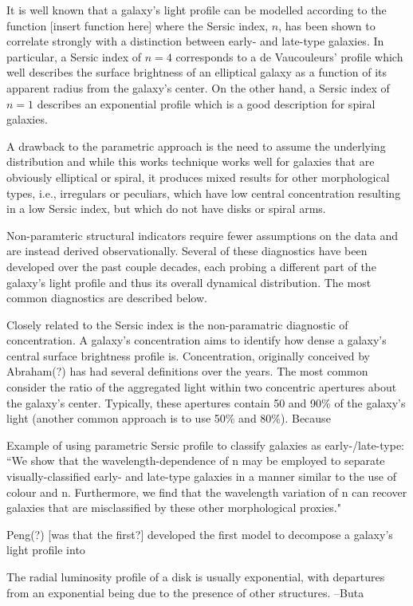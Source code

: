 It is well known that a galaxy's light profile can be modelled according to the function [insert function here] where the Sersic index, $n$, has been shown to correlate strongly with a distinction between early- and late-type galaxies. In particular, a Sersic index of $n=4$ corresponds to a de Vaucouleurs' profile which well describes the surface brightness of an elliptical galaxy as a function of its apparent radius from the galaxy's center. On the other hand, a Sersic index of $n=1$ describes an exponential profile which is a good description for spiral galaxies. 

A drawback to the parametric approach is the need to assume the underlying distribution and while this works technique works well for galaxies that are obviously elliptical or spiral, it produces mixed results for other morphological types, i.e., irregulars or peculiars, which have low central concentration resulting in a low Sersic index, but which do not have disks or spiral arms. 

Non-paramteric structural indicators require fewer assumptions on the data and are instead derived observationally. Several of these diagnostics have been developed over the past couple decades, each probing a different part of the galaxy's light profile and thus its overall dynamical distribution. The most common diagnostics are described below. 

Closely related to the Sersic index is the non-paramatric diagnostic of concentration. A galaxy's concentration aims to identify how dense a galaxy's central surface brightness profile is. Concentration, originally conceived by Abraham(?) has had several definitions over the years. The most common consider the ratio of the aggregated light within two concentric apertures about the galaxy's center. Typically, these apertures contain 50 and 90\% of the galaxy's light (another common approach is to use 50\% and 80\%). Because 


Example of using parametric Sersic profile to classify galaxies as early-/late-type:
``We show that the wavelength-dependence of n may be employed to separate visually-classified early- and late-type galaxies in a manner similar to the use of colour and n. Furthermore, we find that the wavelength variation of n can recover galaxies that are misclassified by these other morphological proxies."\citep{Vika2015}

Peng(?) [was that the first?] developed the first model to decompose a galaxy's light profile into 

The radial luminosity profile of a disk is usually exponential, with departures from an
exponential being due to the presence of other structures. --Buta

